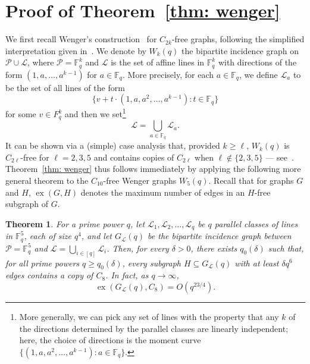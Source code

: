 \documentclass[A4paper,reqno,oneside,11pt]{amsart}
\theoremstyle{plain}
\newtheorem{theorem}{Theorem}[section]
\theoremstyle{definition}
\newcommand{\scL}{\mathscr{L}}
\newcommand{\scP}{\mathscr{P}}
\newcommand{\F}{\mathbb{F}}
\newcommand{\ex}{\operatorname{ex}}
\def\d{\delta}
\def\l{\ell}
\begin{document}

\section{Proof of Theorem~\ref{thm: wenger}}
\label{section: wenger}

We first recall Wenger's construction~\cite{Wenger} for $C_{2k}$-free graphs, following the simplified interpretation given in~\cite{Con21}.
We denote by $W_k(q)$ the bipartite incidence graph on $\scP \cup \scL$, where $\scP = \F_q^k$ 
and $\scL$ is the set of affine lines in $\F_q^k$ with directions of the form $(1,a,\dots,a^{k-1})$ for $a \in \F_q$.
More precisely, for each $a \in \F_q$, we define $\scL_a$ to be the set of all lines of the form 
\begin{equation*}
    \{v + t \cdot (1,a,a^2,\dots,a^{k-1}): t \in \F_q\}
\end{equation*}
for some $v \in F_q^k$ and then we set\footnote{More generally, we can pick any set of lines with the property that any $k$ of the directions determined by the parallel classes are linearly independent; here, the choice of directions is the moment curve $\{(1, a, a^2, \dots, a^{k-1}): a \in \F_q\}$.}
\begin{equation*}
    \scL = \bigcup_{a \in \F_q} \scL_a.
\end{equation*}
It can be shown via a (simple) case analysis that, provided $k \geq \l$, $W_k(q)$ is $C_{2\l}$-free for $\l=2,3,5$ %
and contains copies of $C_{2\l}$ when $\l \notin \{2,3,5\}$ --- see~\cite[Theorem 1]{Con21}.
Theorem~\ref{thm: wenger} thus follows immediately by applying the following more general theorem to the $C_{10}$-free Wenger graphs $W_5(q)$. 
Recall that for graphs $G$ and $H$, $\ex(G,H)$ denotes the maximum number of edges in an $H$-free subgraph of $G$.

\begin{theorem}
\label{thm: main}
    For a prime power $q$, let $\scL_1, \scL_2, \dots, \scL_q$ be $q$ parallel classes of lines in $\F_q^5$, each of size $q^4$, and let $G_\scL(q)$ be the bipartite incidence graph between $\scP = \F_q^5$ and $\scL = \bigcup_{i \in [q]} \scL_i$. 
    Then, for every $\d > 0$, there exists $q_0(\delta)$ such that, for all prime powers $q \geq q_0(\d)$,
    every subgraph $H \subseteq G_\scL(q)$ with at least $\d q^6$ edges contains a copy of $C_8$.
    In fact, as $q \to \infty$,
    \begin{equation*}
        \ex \left( G_\scL(q),C_8 \right)= O(q^{23/4}).
    \end{equation*}
\end{theorem}
\end{document}
